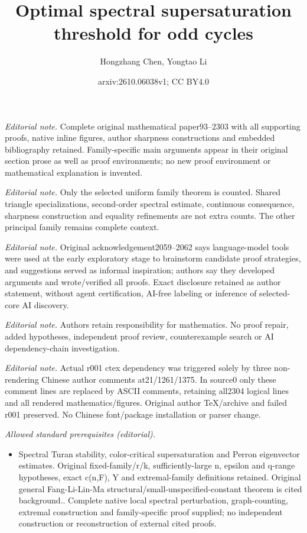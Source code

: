 \documentclass[11pt,a4paper]{article}
\title{Optimal spectral supersaturation threshold for odd cycles}
\author{Hongzhang Chen, Yongtao Li}
\date{arxiv:2610.06038v1; CC BY4.0}
\theoremstyle{definition}
\theoremstyle{plain}
\begin{document}
\maketitle
\noindent\textit{Editorial note.} Complete original mathematical paper93--2303 with all supporting proofs, native inline figures, author sharpness constructions and embedded bibliography retained. Family-specific main arguments appear in their original section prose as well as proof environments; no new proof environment or mathematical explanation is invented.\par\medskip
\noindent\textit{Editorial note.} Only the selected uniform family theorem is counted. Shared triangle specializations, second-order spectral estimate, continuous consequence, sharpness construction and equality refinements are not extra counts. The other principal family remains complete context.\par\medskip
\noindent\textit{Editorial note.} Original acknowledgement2059--2062 says language-model tools were used at the early exploratory stage to brainstorm candidate proof strategies, and suggestions served as informal inspiration; authors say they developed arguments and wrote/verified all proofs. Exact disclosure retained as author statement, without agent certification, AI-free labeling or inference of selected-core AI discovery.\par\medskip
\noindent\textit{Editorial note.} Authors retain responsibility for mathematics. No proof repair, added hypotheses, independent proof review, counterexample search or AI dependency-chain investigation.\par\medskip
\noindent\textit{Editorial note.} Actual r001 ctex dependency was triggered solely by three non-rendering Chinese author comments at21/1261/1375. In source0 only these comment lines are replaced by ASCII comments, retaining all2304 logical lines and all rendered mathematics/figures. Original author TeX/archive and failed r001 preserved. No Chinese font/package installation or parser change.\par\medskip
\noindent\textit{Allowed standard prerequisites (editorial).}\begin{itemize}
\item Spectral Turan stability, color-critical supersaturation and Perron eigenvector estimates. Original fixed-family/r/k, sufficiently-large n, epsilon and q-range hypotheses, exact c(n,F), Y and extremal-family definitions retained. Original general Fang-Li-Lin-Ma structural/small-unspecified-constant theorem is cited background.. Complete native local spectral perturbation, graph-counting, extremal construction and family-specific proof supplied; no independent construction or reconstruction of external cited proofs.
\end{itemize}\medskip
\end{document}
